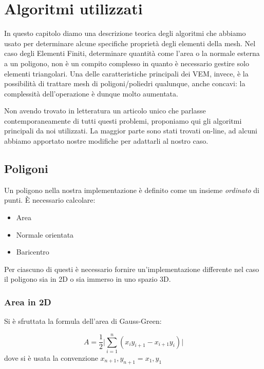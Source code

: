 \documentclass[oneside,12pt]{book}  %
\theoremstyle{plain}
\theoremstyle{definition}
\theoremstyle{remark}
\numberwithin{equation}{chapter} %
\begin{document}

\chapter{Algoritmi utilizzati}
\label{ch:algorithms}
In questo capitolo diamo una descrizione teorica degli algoritmi che
abbiamo usato per determinare alcune specifiche propriet\`a degli
elementi della mesh. Nel caso degli Elementi Finiti, determinare
quantit\`a come l'area o la normale esterna a un poligono, non \`e un
compito complesso in quanto \`e necessario gestire solo elementi
triangolari.
Una delle caratteristiche principali dei VEM, invece, \`e la
possibilit\`a di trattare mesh di poligoni/poliedri qualunque, anche concavi:
la complessit\`a dell'operazione \`e dunque molto aumentata.

Non avendo trovato in letteratura un articolo unico che parlasse
contemporaneamente di tutti questi problemi, proponiamo qui gli
algoritmi principali da noi utilizzati. La maggior parte sono stati
trovati on-line, ad alcuni abbiamo apportato nostre modifiche per
adattarli al nostro caso.

\section{Poligoni}
Un poligono nella nostra implementazione \`e definito come un insieme
\textit{ordinato} di punti. 
\`E necessario calcolare:
\begin{itemize}
\item Area
\item Normale orientata
\item Baricentro
\end{itemize}
Per ciascuno di questi \`e necessario fornire un'implementazione
differente nel caso il poligono sia in 2D o sia immerso in uno spazio 3D.

\subsection{Area in 2D}
Si \`e sfruttata la formula dell'area di Gauss-Green:

$$ A=\frac{1}{2} \bigg | \sum_{i=1}^n (x_iy_{i+1}-x_{i+1}y_i) \bigg
|$$
dove si \`e usata la convenzione $x_{n+1},y_{n+1}=x_1,y_1$

\end{document}
